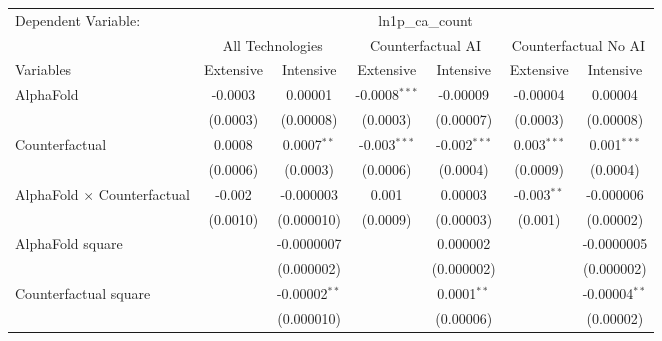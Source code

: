 \begingroup
\centering
\begin{tabular}{lcccccc}
   \tabularnewline \midrule \midrule
   Dependent Variable: & \multicolumn{6}{c}{ln1p\_ca\_count}\\
 & \multicolumn{2}{c}{All Technologies} & \multicolumn{2}{c}{Counterfactual AI} & \multicolumn{2}{c}{Counterfactual No AI} \\
\cmidrule(lr){1-1}\cmidrule(lr){2-3} \cmidrule(lr){4-5} \cmidrule(lr){6-7}
Variables & \multicolumn{1}{c}{Extensive} & \multicolumn{1}{c}{Intensive} & \multicolumn{1}{c}{Extensive} & \multicolumn{1}{c}{Intensive} & \multicolumn{1}{c}{Extensive} & \multicolumn{1}{c}{Intensive} \\
\cmidrule(lr){1-1}\cmidrule(lr){2-2} \cmidrule(lr){3-3} \cmidrule(lr){4-4} \cmidrule(lr){5-5} \cmidrule(lr){6-6} \cmidrule(lr){7-7}
   AlphaFold                          & -0.0003  & 0.00001           & -0.0008$^{***}$ & -0.00009       & -0.00004      & 0.00004\\   
                                      & (0.0003) & (0.00008)         & (0.0003)        & (0.00007)      & (0.0003)      & (0.00008)\\   
   Counterfactual                     & 0.0008   & 0.0007$^{**}$     & -0.003$^{***}$  & -0.002$^{***}$ & 0.003$^{***}$ & 0.001$^{***}$\\   
                                      & (0.0006) & (0.0003)          & (0.0006)        & (0.0004)       & (0.0009)      & (0.0004)\\   
   AlphaFold $\times$ Counterfactual  & -0.002   & -0.000003         & 0.001           & 0.00003        & -0.003$^{**}$ & -0.000006\\   
                                      & (0.0010) & (0.000010)        & (0.0009)        & (0.00003)      & (0.001)       & (0.00002)\\   
   AlphaFold square                   &          & -0.0000007        &                 & 0.000002       &               & -0.0000005\\   
                                      &          & (0.000002)        &                 & (0.000002)     &               & (0.000002)\\   
   Counterfactual square              &          & -0.00002$^{**}$   &                 & 0.0001$^{**}$  &               & -0.00004$^{**}$\\   
                                      &          & (0.000010)        &                 & (0.00006)      &               & (0.00002)\\   

\end{tabular}
